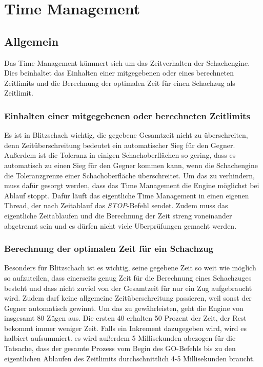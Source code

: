 \def \citeGameMode[#1]{\cite[#1]{gameMode}}
\section{Time Management}\label{sec:timeMan}
\subsection{Allgemein}
Das Time Management kümmert sich um das Zeitverhalten der Schachengine. Dies beinhaltet
das Einhalten einer mitgegebenen oder eines berechneten Zeitlimits und die Berechnung der optimalen Zeit für einen Schachzug als Zeitlimit.

\subsubsection{Einhalten einer mitgegebenen oder berechneten Zeitlimits}
Es ist in Blitzschach wichtig, die gegebene Gesamtzeit nicht zu überschreiten, denn Zeitüberschreitung bedeutet ein automatischer Sieg für den Gegner.\newline
Außerdem ist die Toleranz in einigen Schachoberfl\"achen so gering, dass es automatisch zu einen Sieg f\"ur den Gegner kommen kann, wenn die Schachengine die Toleranzgrenze einer Schachoberfl\"ache \"uberschreitet. \cite[0]{tctolerance}
\newline Um das zu verhindern, muss dafür gesorgt werden, dass das Time Management die Engine möglichst bei Ablauf stoppt. Dafür läuft das eigentliche Time Management in einen eigenen Thread, der nach Zeitablauf das \textit{STOP}-Befehl sendet. Zudem muss das eigentliche Zeitablaufen und die Berechnung der Zeit streng voneinander abgetrennt sein und es d\"urfen nicht viele U\"berpr\"ufungen gemacht werden. 

\subsubsection{Berechnung der optimalen Zeit für ein Schachzug}
Besonders für Blitzschach ist es wichtig, seine gegebene Zeit so weit wie möglich so aufzuteilen, dass einerseits genug Zeit für die Berechnung eines Schachzuges besteht und dass nicht zuviel von der Gesamtzeit für nur ein Zug aufgebraucht wird. Zudem darf keine allgemeine Zeitüberschreitung passieren, weil sonst der Gegner automatisch gewinnt. 
\newline Um das zu gewährleisten, geht die Engine von insgesamt 80 Zügen aus. Die ersten 40 erhalten 50 Prozent der Zeit, der Rest bekommt immer weniger Zeit. Falls ein Inkrement dazugegeben wird, wird es halbiert aufsummiert. 
\newline es wird außerdem 5 Millisekunden abezogen f\"ur die Tatsache, dass der gesamte Prozess vom Begin des GO-Befehls bis zu den eigentlichen Ablaufen des Zeitlimits durchschnittlich 4-5 Millisekunden braucht.

